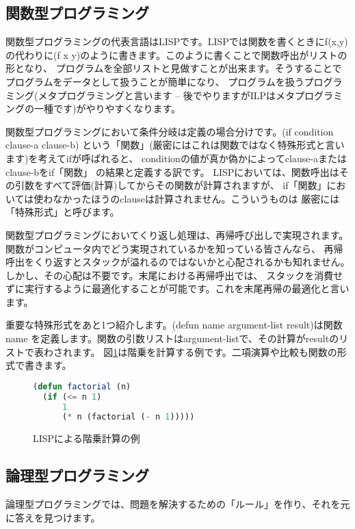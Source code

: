 \documentclass[a4j,dvipdfmx]{jsarticle}
\newcommand{\fixed}[1]{{\ttfamily #1}}
\begin{document}
\subsection{関数型プログラミング}
関数型プログラミングの代表言語はLISPです。LISPでは関数を書くときに{\fixed f(x,y)}
の代わりに{\fixed (f x y)}のように書きます。このように書くことで関数呼出がリストの形となり、
プログラムを全部リストと見做すことが出来ます。そうすることでプログラムをデータとして扱うことが簡単になり、
プログラムを扱うプログラミング(メタプログラミングと言います -- 
後でやりますがILPはメタプログラミングの一種です)がやりやすくなります。

関数型プログラミングにおいて条件分岐は定義の場合分けです。{\fixed (if condition clause-a clause-b)}
という「関数」(厳密にはこれは関数ではなく特殊形式と言います)を考えて{\fixed if}が呼ばれると、
{\fixed condition}の値が真か偽かによって{\fixed clause-a}または{\fixed clause-b}を{\fixed if}「関数」
の結果と定義する訳です。
LISPにおいては、関数呼出はその引数をすべて評価(計算)してからその関数が計算されますが、
{\fixed if}「関数」においては使わなかったほうの{\fixed clause}は計算されません。こういうものは
厳密には「特殊形式」と呼びます。

関数型プログラミングにおいてくり返し処理は、再帰呼び出しで実現されます。
関数がコンピュータ内でどう実現されているかを知っている皆さんなら、
再帰呼出をくり返すとスタックが溢れるのではないかと心配されるかも知れません。
しかし、その心配は不要です。末尾における再帰呼出では、
スタックを消費せずに実行するように最適化することが可能です。これを末尾再帰の最適化と言います。

重要な特殊形式をあと1つ紹介します。{\fixed (defun name argument-list result)}は関数{\fixed name}
を定義します。関数の引数リストは{\fixed argument-list}で、その計算が{\fixed result}のリストで表わされます。
図\ref{fig:fibonacci}は階乗を計算する例です。二項演算や比較も関数の形式で書きます。

\begin{figure}[htbp]
\centering
\begin{lstlisting}[language=Lisp]
(defun factorial (n)
  (if (<= n 1)
      1
      (* n (factorial (- n 1)))))
\end{lstlisting}
\caption{LISPによる階乗計算の例}
\label{fig:fibonacci}
\end{figure}

\subsection{論理型プログラミング}
論理型プログラミングでは、問題を解決するための「ルール」を作り、それを元に答えを見つけます。
\end{document}
